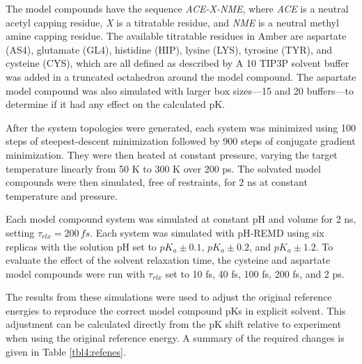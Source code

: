 The model compounds have the sequence \emph{ACE-X-NME}, where \emph{ACE} is a
neutral acetyl capping residue, \emph{X} is a titratable residue, and \emph{NME}
is a neutral methyl amine capping residue.
\cite{Mongan_JComputChem_2004_v25_p2038} The available titratable residues in
Amber are aspartate (AS4), glutamate (GL4), histidine (HIP), lysine (LYS),
tyrosine (TYR), and cysteine (CYS), which are all defined as described by
\citeauthor{Mongan_JComputChem_2004_v25_p2038}
\cite{Mongan_JComputChem_2004_v25_p2038}  A 10 \text{\AA} TIP3P
\cite{Jorgensen_JChemPhys_1983_v79_p926} solvent buffer was added in a truncated
octahedron around the model compound.  The aspartate model compound was also
simulated with larger box sizes---15 \text{\AA} and 20 \text{\AA} buffers---to
determine if it had any effect on the calculated pK.

After the system topologies were generated, each system was minimized using 100
steps of steepest-descent minimization followed by 900 steps of conjugate
gradient minimization.  They were then heated at constant pressure, varying the
target temperature linearly from 50 K to 300 K over 200 ps.  The solvated model
compounds were then simulated, free of restraints, for 2 ns at constant
temperature and pressure.

Each model compound system was simulated at constant pH and volume for 2 ns,
setting $\tau_{rlx} = 200\,fs$. Each system was simulated with pH-REMD using six
replicas with the solution pH set to $pK_a \pm 0.1$, $pK_a \pm 0.2$, and $pK_a
\pm 1.2$. To evaluate the effect of the solvent relaxation time, the cysteine
and aspartate model compounds were run with $\tau_{rlx}$ set to 10 fs, 40 fs,
100 fs, 200 fs, and 2 ps.

The results from these simulations were used to adjust the original reference
energies to reproduce the correct model compound pKs in explicit solvent.
This adjustment can be calculated directly from the pK shift relative to
experiment when using the original reference energy. A summary of the required
changes is given in Table \ref{tbl4:refenes}.


